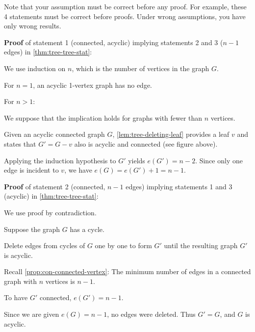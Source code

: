 \documentclass[../src/handouts/main.tex]{subfiles}
\begin{document}
Note that your assumption must be correct before any proof. For example, these 4 statements must be correct before proofs. Under wrong assumptions, you have only wrong results.

\textbf{Proof} of statement 1 (connected, acyclic) implying statements 2 and 3 ($n - 1$ edges) in \cref{thm:tree-tree-stat}:

\begin{enumerate*}
  \vspace{-.25em} %
  \item We use induction on $n$, which is the number of vertices in the graph $G$.
  \item For $n = 1$, an acyclic 1-vertex graph has no edge.
  \item For $n > 1$:
    \vspace{.5em}
    \begin{enumerate*}
      \item We suppose that the implication holds for graphs with fewer than $n$ vertices.
      \item Given an acyclic connected graph $G$, \cref{lem:tree-deleting-leaf} provides a leaf $v$ and states that $G' = G - v$ also is acyclic and connected (see figure above).
      \item Applying the induction hypothesis to $G'$ yields $e \left( G' \right) = n - 2$. Since only one edge is incident to $v$, we have $e(G) = e \left( G' \right) + 1 = n - 1$.
    \end{enumerate*}
    \vspace{.25em} %
\end{enumerate*}
\vspace{.5em} %

\textbf{Proof} of statement 2 (connected, $n - 1$ edges) implying statements 1 and 3 (acyclic) in \cref{thm:tree-tree-stat}:
\begin{enumerate*}
  \item We use proof by contradiction.
  \item Suppose the graph $G$ has a cycle.
  \item Delete edges from cycles of $G$ one by one to form $G'$ until the resulting graph $G'$ is acyclic. 
  \item Recall \cref{prop:con-connected-vertex}: The minimum number of edges in a connected graph with $n$ vertices is $n - 1$.
  \item To have $G'$ connected, $e\left( G' \right) = n - 1$.
  \item Since we are given $e(G) = n - 1$, no edges were deleted. Thus $G' = G$, and $G$ is acyclic.
\end{enumerate*}
\vspace{.5em} %
\end{document}

